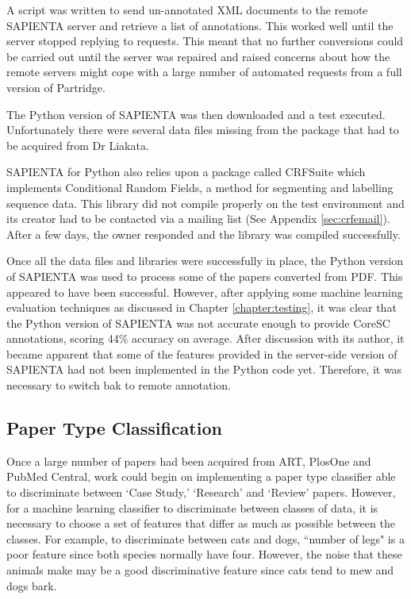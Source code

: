 A script was written to send un-annotated XML documents to the remote SAPIENTA
server and retrieve a list of annotations. This worked well until the server
stopped replying to requests. This meant that no further conversions could be
carried out until the server was repaired and raised concerns about how the
remote servers might cope with a large number of automated requests from a
full version of Partridge.

The Python version of SAPIENTA was then downloaded and a test executed.
Unfortunately there were several data files missing from the package that had
to be acquired from Dr Liakata. 

SAPIENTA for Python also relies upon a package called CRFSuite which implements
Conditional Random Fields, a method for segmenting and labelling sequence
data\cite{CRFsuite}. This library did not compile properly on the test
environment and its creator had to be contacted via a mailing list (See
Appendix \ref{sec:crfemail}). After a few days, the owner responded and the
library was compiled successfully.  

Once all the data files and libraries were successfully in place, the Python
version of SAPIENTA was used to process some of the papers converted from PDF.
This appeared to have been successful. However, after applying some machine
learning evaluation techniques as discussed in Chapter \ref{chapter:testing},
it was clear that the Python version of SAPIENTA was not accurate enough to
provide CoreSC annotations, scoring 44\% accuracy on average. After discussion
with its author, it became apparent that some of the features provided in the
server-side version of SAPIENTA had not been implemented in the Python code
yet. Therefore, it was necessary to switch bak to remote annotation.

\subsection{Paper Type Classification}

Once a large number of papers had been acquired from ART, PlosOne and PubMed
Central, work could begin on implementing a paper type classifier able to
discriminate between `Case Study,' `Research' and `Review' papers. However,
for a machine learning classifier to discriminate between classes of data, it
is necessary to choose a set of features that differ as much as possible
between the classes. For example, to discriminate between cats and dogs,
``number of legs" is a poor feature since both species normally have four.
However, the noise that these animals make may be a good discriminative feature
since cats tend to mew and dogs bark. 

